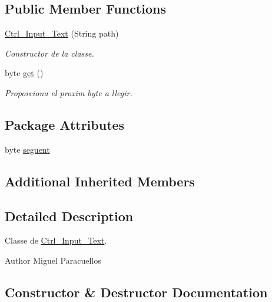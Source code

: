 \subsection*{Public Member Functions}
\begin{DoxyCompactItemize}
\item 
\hyperlink{classpersistencia_1_1input_1_1Ctrl__Input__Text_a945833e6bb2bb3fbdb328ae01392410f}{Ctrl\+\_\+\+Input\+\_\+\+Text} (String path)
\begin{DoxyCompactList}\small\item\em Constructor de la classe. \end{DoxyCompactList}\item 
byte \hyperlink{classpersistencia_1_1input_1_1Ctrl__Input__Text_a8b501ae723f8c6f8d63305a56e9720c3}{get} ()
\begin{DoxyCompactList}\small\item\em Proporciona el proxim byte a llegir. \end{DoxyCompactList}\end{DoxyCompactItemize}
\subsection*{Package Attributes}
\begin{DoxyCompactItemize}
\item 
byte \hyperlink{classpersistencia_1_1input_1_1Ctrl__Input__Text_a533e9e0497774114b57d8dd5a6bbb000}{seguent}
\end{DoxyCompactItemize}
\subsection*{Additional Inherited Members}


\subsection{Detailed Description}
Classe de \hyperlink{classpersistencia_1_1input_1_1Ctrl__Input__Text}{Ctrl\+\_\+\+Input\+\_\+\+Text}. 

\begin{DoxyAuthor}{Author}
Miguel Paracuellos 
\end{DoxyAuthor}


\subsection{Constructor \& Destructor Documentation}
\mbox{\label{classpersistencia_1_1input_1_1Ctrl__Input__Text_a945833e6bb2bb3fbdb328ae01392410f}} 
